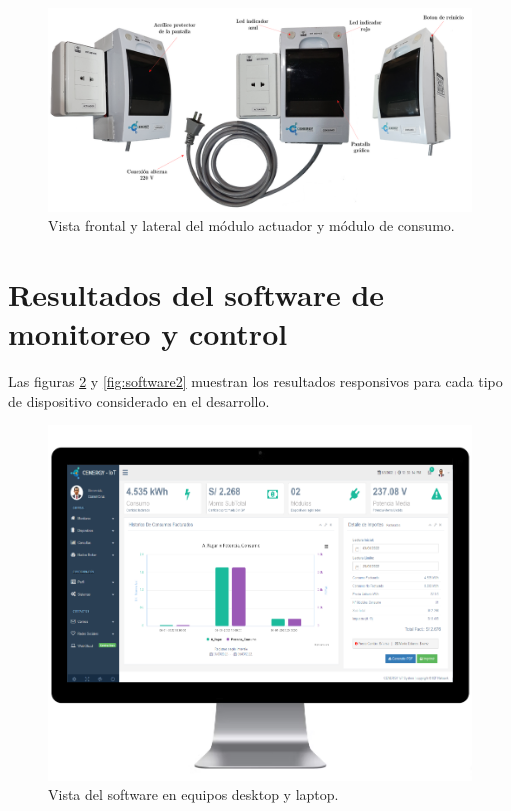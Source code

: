 
\begin{landscape} %
\begin{figure}[htpb]
\centering 
\includegraphics[width=1.8\textwidth]{./Figures/consumo3.png}
\caption{Vista frontal y lateral del módulo actuador y módulo de consumo.}
\label{fig:modConsumo2}
\end{figure}
\end{landscape} %


\section{Resultados del software de monitoreo y control}

Las figuras \ref{fig:software1} y \ref{fig:software2} muestran los resultados responsivos para cada tipo de dispositivo considerado en el desarrollo.

\vspace{0.5cm}
\begin{figure}[htpb]
\centering 
\includegraphics[width=0.62 \textwidth]{./Figures/responsive1.png}
\caption{Vista del software en equipos desktop y laptop.}
\label{fig:software1}
\end{figure}

